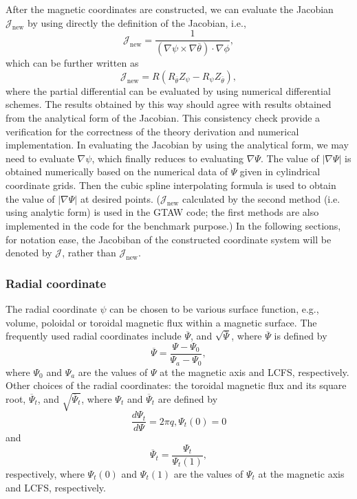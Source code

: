 \documentclass{llncs}
\newcommand{\tmop}[1]{\ensuremath{\operatorname{#1}}}
\begin{document}
After the magnetic coordinates are constructed, we can evaluate the Jacobian
$\mathcal{J}_{\tmop{new}}$ by using directly the definition of the Jacobian,
i.e.,
\begin{equation}
  \mathcal{J}_{\tmop{new}} = \frac{1}{(\nabla \psi \times \nabla
  \overline{\theta}) \cdot \nabla \phi},
\end{equation}
which can be further written as
\begin{equation}
  \mathcal{J}_{\tmop{new}} = R (R_{\overline{\theta}} Z_{\psi} - R_{\psi}
  Z_{\overline{\theta}}),
\end{equation}
where the partial differential can be evaluated by using numerical
differential schemes. The results obtained by this way should agree with
results obtained from the analytical form of the Jacobian. This consistency
check provide a verification for the correctness of the theory derivation and
numerical implementation. In evaluating the Jacobian by using the analytical
form, we may need to evaluate $\nabla \psi$, which finally reduces to
evaluating $\nabla \Psi$. The value of $| \nabla \Psi |$ is obtained
numerically based on the numerical data of $\Psi$ given in cylindrical
coordinate grids. Then the cubic spline interpolating formula is used to
obtain the value of $| \nabla \Psi |$ at desired points.
($\mathcal{J}_{\tmop{new}}$ calculated by the second method (i.e. using
analytic form) is used in the GTAW code; the first methods are also
implemented in the code for the benchmark purpose.) In the following sections,
for notation ease, the Jacobiban of the constructed coordinate system will be
denoted by $\mathcal{J}$, rather than $\mathcal{J}_{\tmop{new}}$.

\subsubsection{Radial coordinate}\label{9-27-1}

The radial coordinate $\psi$ can be chosen to be various surface function,
e.g., volume, poloidal or toroidal magnetic flux within a magnetic surface.
The frequently used radial coordinates include $\overline{\Psi}$, and
$\sqrt{\overline{\Psi}}$, where $\overline{\Psi}$ is defined by
\begin{equation}
  \label{19-4-11-3} \overline{\Psi} = \frac{\Psi - \Psi_0}{\Psi_a - \Psi_0},
\end{equation}
where $\Psi_0$ and $\Psi_a$ are the values of $\Psi$ at the magnetic axis and
LCFS, respectively. Other choices of the radial coordinates: the toroidal
magnetic flux and its square root, $\overline{\Psi}_t$, and
$\sqrt{\overline{\Psi}_t}$, where $\Psi_t$ and $\overline{\Psi}_t$ are defined
by
\begin{equation}
  \frac{d \Psi_t}{d \Psi} = 2 \pi q, \Psi_t (0) = 0
\end{equation}
and
\begin{equation}
  \overline{\Psi}_t = \frac{\Psi_t}{\Psi_t (1)},
\end{equation}
respectively, where $\Psi_t (0)$ and $\Psi_t (1)$ are the values of $\Psi_t$
at the magnetic axis and LCFS, respectively.
\end{document}
